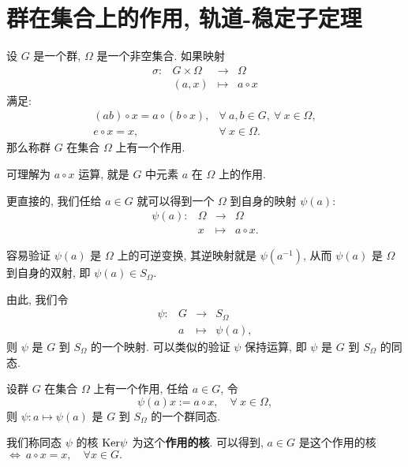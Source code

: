 

\section{群在集合上的作用, 轨道-稳定子定理}

\begin{definition}\label{群作用}
	设 $G$ 是一个群, $\Omega$ 是一个非空集合. 如果映射
	$$
	\begin{array}{rccl}
		\sigma:&G\times \Omega & \to & \Omega \\
		&(a,x) & \mapsto & a \circ x
	\end{array}
	$$
	满足:
	$$
	\begin{array}{rl}
		(ab)\circ x=a\circ(b\circ x), & \forall\ a,b \in G,\ \forall\  x\in \Omega, \\
		e\circ x= x, & \forall\ x \in \Omega.
	\end{array}
	$$
	那么称群 $G$ 在集合 $\Omega$ 上有一个作用.
\end{definition}
\begin{remark*}
	可理解为 $a \circ x$ 运算, 就是 $G$ 中元素 $a$ 在 $\Omega$ 上的作用.

	更直接的, 我们任给 $a\in G$ 就可以得到一个 $\Omega$ 到自身的映射 $\psi(a)$:
	$$
	\begin{array}{rccl}
		\psi(a):& \Omega & \to & \Omega \\
		& x & \mapsto & a\circ x.
	\end{array}
	$$

	容易验证 $\psi(a)$ 是 $\Omega$ 上的可逆变换, 其逆映射就是 $\psi(a^{-1})$, 从而 $\psi(a)$ 是 $\Omega$ 到自身的双射, 即 $\psi(a) \in S_\Omega$.

	由此, 我们令
	$$
	\begin{array}{rccl}
		\psi: & G &\to&S_\Omega \\
		& a & \mapsto & \psi(a),
	\end{array}
	$$
	则 $\psi$ 是 $G$ 到 $S_\Omega$ 的一个映射. 可以类似的验证 $\psi$ 保持运算, 即 $\psi$ 是 $G$ 到 $S_\Omega$ 的同态.
\end{remark*}
\begin{proposition}
	设群 $G$ 在集合 $\Omega$ 上有一个作用, 任给 $a\in G$, 令
	$$\psi(a)x:=a\circ x,\quad \forall\ x\in \Omega,$$
	则 $\psi:a\mapsto\psi(a)$ 是 $G$ 到 $S_\Omega$ 的一个群同态.
\end{proposition}

\begin{definition}\label{作用的核}
	我们称同态 $\psi$ 的核 $\text {Ker}\psi$ 为这个\textbf{作用的核}. 可以得到, $a\in G$ 是这个作用的核 $\Leftrightarrow\ a\circ x=x,\quad \forall x \in G.$
\end{definition}

